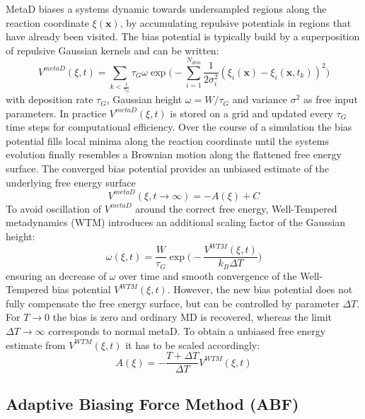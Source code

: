 MetaD biases a systems dynamic towards undersampled regions along the reaction coordinate $\xi(\textbf{x})$, by accumulating repulsive potentials in regions that have already been visited. The bias potential is typically build by a superposition of repulsive Gaussian kernels and can be written:\autocite{barducci2011metadynamics}
\begin{equation}
  V^{metaD}(\xi,t)= \sum_{k<\frac{t}{\tau_G}} \tau_G \omega \exp\biggr(-\sum_{i=1}^{N_{dim}} \frac{1}{2\sigma_{i}^{2}} (\xi_{i}(\textbf{x})-\xi_{i}(\textbf{x},t_k))^2 \biggl)
\end{equation}
with deposition rate $\tau_G$, Gaussian height $\omega=W/\tau_G$ and variance $\sigma^2$ as free input parameters. In practice $V^{metaD}(\xi,t)$ is stored on a grid and updated every $\tau_G$ time steps for computational efficiency. Over the course of a simulation the bias potential fills local minima along the reaction coordinate until the systems evolution finally resembles a Brownian motion along the flattened free energy surface. The converged bias potential provides an unbiased estimate of the underlying free energy surface
\begin{equation}
  V^{metaD}(\xi, t \to \infty) = - A(\xi) + C
\end{equation}
To avoid oscillation of $V^{metaD}$ around the correct free energy, Well-Tempered metadynamics (WTM) introduces an additional scaling factor of the Gaussian height:\autocite{barducci2008well}
\begin{equation}
  \omega(\xi,t) = \frac{W}{\tau_G}\exp\biggl(-\frac{V^{WTM}(\xi,t)}{k_B \Delta T} \biggr)
\end{equation}
ensuring an decrease of $\omega$ over time and smooth convergence of the Well-Tempered bias potential $V^{WTM}(\xi,t)$. However, the new bias potential does not fully compensate the free energy surface, but can be controlled by parameter $\Delta T$. For $T \to 0$ the bias is zero and ordinary MD is recovered, whereas the limit $\Delta T \to \infty$ corresponds to normal metaD. To obtain a unbiased free energy estimate from $V^{WTM}(\xi,t)$ it has to be scaled accordingly:
\begin{equation}
A(\xi) = -\frac{T+\Delta T}{\Delta T}V^{WTM}(\xi, t)
\end{equation}

\subsection{Adaptive Biasing Force Method (ABF)}
\label{sec:ABF}

